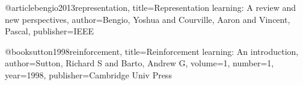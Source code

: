 \documentclass{article}
\begin{document}
@article{bengio2013representation,
  title={Representation learning: A review and new perspectives},
  author={Bengio, Yoshua and Courville, Aaron and Vincent, Pascal},
  publisher={IEEE}
}

@book{sutton1998reinforcement,
  title={Reinforcement learning: An introduction},
  author={Sutton, Richard S and Barto, Andrew G},
  volume={1},
  number={1},
  year={1998},
  publisher={Cambridge Univ Press}
}
\end{document}
